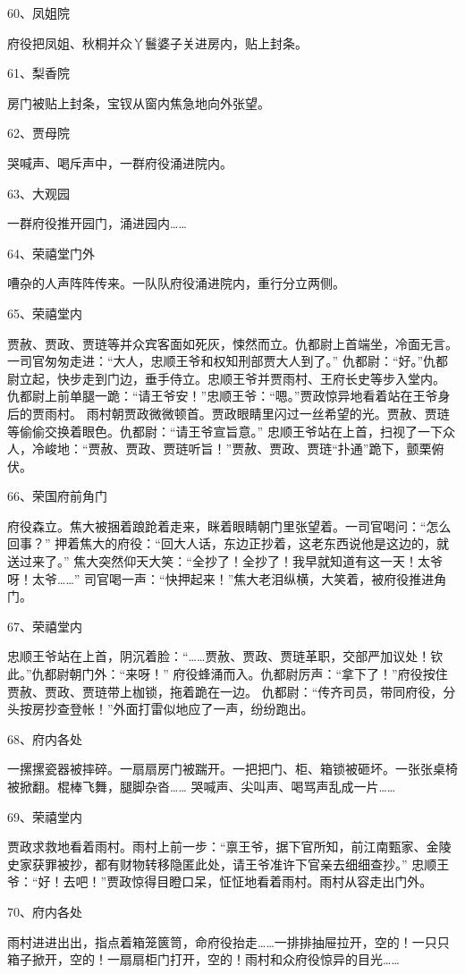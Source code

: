 60、凤姐院\par
府役把凤姐、秋桐并众丫鬟婆子关进房内，贴上封条。

61、梨香院\par
房门被贴上封条，宝钗从窗内焦急地向外张望。

62、贾母院\par
哭喊声、喝斥声中，一群府役涌进院内。

63、大观园\par
一群府役推开园门，涌进园内……

64、荣禧堂门外\par
嘈杂的人声阵阵传来。一队队府役涌进院内，重行分立两侧。

65、荣禧堂内\par
贾赦、贾政、贾琏等并众宾客面如死灰，悚然而立。仇都尉上首端坐，冷面无言。一司官匆匆走进：“大人，忠顺王爷和权知刑部贾大人到了。”
仇都尉：“好。”仇都尉立起，快步走到门边，垂手侍立。忠顺王爷并贾雨村、王府长史等步入堂内。
仇都尉上前单腿一跪：“请王爷安！”忠顺王爷：“嗯。”贾政惊异地看着站在王爷身后的贾雨村。
雨村朝贾政微微顿首。贾政眼睛里闪过一丝希望的光。贾赦、贾琏等偷偷交换着眼色。仇都尉：“请王爷宣旨意。”
忠顺王爷站在上首，扫视了一下众人，冷峻地：“贾赦、贾政、贾琏听旨！”贾赦、贾政、贾琏“扑通”跪下，颤栗俯伏。

66、荣国府前角门\par
府役森立。焦大被捆着踉跄着走来，眯着眼睛朝门里张望着。一司官喝问：“怎么回事？”
押着焦大的府役：“回大人话，东边正抄着，这老东西说他是这边的，就送过来了。”
焦大突然仰天大笑：“全抄了！全抄了！我早就知道有这一天！太爷呀！太爷……”
司官喝一声：“快押起来！”焦大老泪纵横，大笑着，被府役推进角门。

67、荣禧堂内\par
忠顺王爷站在上首，阴沉着脸：“……贾赦、贾政、贾琏革职，交部严加议处！钦此。”仇都尉朝门外：“来呀！”
府役蜂涌而入。仇都尉厉声：“拿下了！”府役按住贾赦、贾政、贾琏带上枷锁，拖着跪在一边。
仇都尉：“传齐司员，带同府役，分头按房抄查登帐！”外面打雷似地应了一声，纷纷跑出。

68、府内各处\par
一摞摞瓷器被摔碎。一扇扇房门被踹开。一把把门、柜、箱锁被砸坏。一张张桌椅被掀翻。棍棒飞舞，腿脚杂沓……
哭喊声、尖叫声、喝骂声乱成一片……

69、荣禧堂内\par
贾政求救地看着雨村。雨村上前一步：“禀王爷，据下官所知，前江南甄家、金陵史家获罪被抄，都有财物转移隐匿此处，请王爷准许下官亲去细细查抄。”
忠顺王爷：“好！去吧！”贾政惊得目瞪口呆，怔怔地看着雨村。雨村从容走出门外。

70、府内各处\par
雨村进进出出，指点着箱笼篋笥，命府役抬走……一排排抽屉拉开，空的！一只只箱子掀开，空的！一扇扇柜门打开，空的！雨村和众府役惊异的目光……

